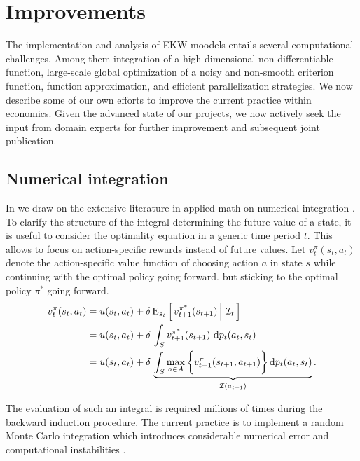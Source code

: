 \section{Improvements}\label{Computation}
The implementation and analysis of EKW moodels entails several computational challenges. Among them integration of a high-dimensional non-differentiable function, large-scale global optimization of a noisy and non-smooth criterion function, function approximation, and efficient parallelization strategies. We now describe some of our own efforts to improve the current practice within economics. Given the advanced state of our projects, we now actively seek the input from domain experts for further improvement and subsequent joint publication.
\subsection{Numerical integration} In \citet{Gabler.2020a} we draw on the extensive literature in applied math on numerical integration \citep{Davis.2007}.\\

\noindent To clarify the structure of the integral determining the future value of a state, it is useful to consider the optimality equation in a generic time period $t$. This allows to focus on action-specific rewards instead of future values. Let $v^{\pi}_{t}(s_t, a_t)$ denote the action-specific value function of choosing action $a$ in state $s$ while continuing with the optimal policy going forward.
but sticking to the optimal policy $\pi^*$ going forward.
%
\begin{align}
v^{\pi}_{t}(s_t, a_t) & = u(s_t, a_t) + \delta\,\mathrm{E}_{s_t} \left[\left.v^{\pi^*}_{t + 1}(s_{t + 1})\,\right\vert\,\mathcal{I}_t\,\right] \\
& =  u(s_t, a_t) + \delta\, \int_S v^{\pi^*}_{t + 1}(s_{t + 1})\, \mathop{}\!\mathrm{d} p_t(a_t, s_t)\\
& =  u(s_t, a_t) + \delta\, \underbrace{\int_S \max_{a \in A}\bigg\{v^\pi_{t + 1}(s_{t + 1}, a_{t + 1})\bigg\}\mathop{}\!\mathrm{d} p_t(a_t, s_t)}_{\mathcal{I}(a_{t + 1})}.
\end{align}

\noindent The evaluation of such an integral is required millions of times during the backward induction procedure. The current practice is to implement a random Monte Carlo integration which introduces considerable numerical error and computational instabilities \citep{Judd.2011}.\\

